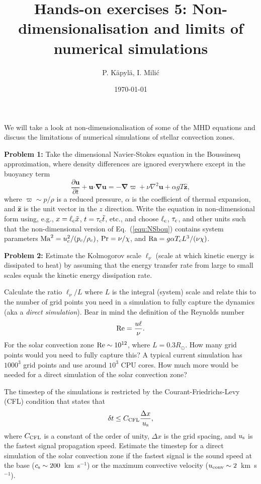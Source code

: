 \documentclass[12pt]{article}
\title{Hands-on exercises 5: Non-dimensionalisation and limits of numerical simulations}
\author{P. K\"{a}pyl\"{a}, I. Mili\'{c}}
\date{\today}
\def\pd{\partial}
\begin{document}
\maketitle

We will take a look at non-dimensionalisation of some of the MHD
equations and discuss the limitations of numerical simulations of
stellar convection zones.

{\bf Problem 1:} Take the dimensional Navier-Stokes equation in the
Boussinesq approximation, where density differences are ignored
everywhere except in the buoyancy term
\begin{equation}
\frac{\pd {\bm u}}{\pd t} + {\bm u}\bm\cdot\bm\nabla {\bm u} = -\bm\nabla\varpi + \nu \nabla^2 {\bm u} + \alpha g T \hat{\bm z},\label{equ:NSbou}
\end{equation}
where $\varpi \sim p/\rho$ is a reduced pressure, $\alpha$ is the
coefficient of thermal expansion, and $\hat{\bm z}$ is the unit vector
in the $z$ direction. Write the equation in non-dimensional form
using, e.g., $x = \ell_{\rm c}\tilde{x}$, $t = \tau_{\rm c}\tilde{t}$,
etc., and choose $\ell_{\rm c}$, $\tau_{\rm c}$, and other units such
that the non-dimensional version of Eq.~(\ref{equ:NSbou}) contains
system parameters ${\rm Ma}^2 = u_c^2/(p_c/\rho_c)$, ${\rm Pr} =
\nu/\chi$, and ${\rm Ra} = g \alpha T_c L^3/(\nu\chi)$.


{\bf Problem 2:} Estimate the Kolmogorov scale $\ell_\nu$ (scale at
which kinetic energy is dissipated to heat) by assuming that the
energy transfer rate from large to small scales equals the kinetic
energy dissipation rate.

Calculate the ratio $\ell_\nu/L$ where $L$ is the integral (system)
scale and relate this to the number of grid points you need in a
simulation to fully capture the dynamics (aka a \emph{direct
simulation}). Bear in mind the definition of the Reynolds number
\begin{equation}
{\rm Re} = \frac{u\ell}{\nu}.
\end{equation}
For the solar convection zone ${\rm Re} \sim 10^{12}$, where $L =
0.3R_\odot$. How many grid points would you need to fully capture
this? A typical current simulation has $1000^3$ grid points and use
around $10^3$ CPU cores. How much more would be needed for a direct
simulation of the solar convection zone?

The timestep of the simulations is restricted by the
Courant-Friedrichs-Levy (CFL) condition that states that
\begin{equation}
  \delta t \leq C_{\rm CFL} \frac{\Delta x}{u_{\rm s}},
\end{equation}
where $C_{\rm CFL}$ is a constant of the order of unity, $\Delta x$ is
the grid spacing, and $u_{\rm s}$ is the fastest signal propagation
speed. Estimate the timestep for a direct simulation of the solar
convection zone if the fastest signal is the sound speed at the base
($c_{\rm s} \sim 200$~km~s$^{-1}$) or the maximum convective velocity
($u_{\rm conv} \sim 2$~km~s$^{-1}$).
\end{document}
